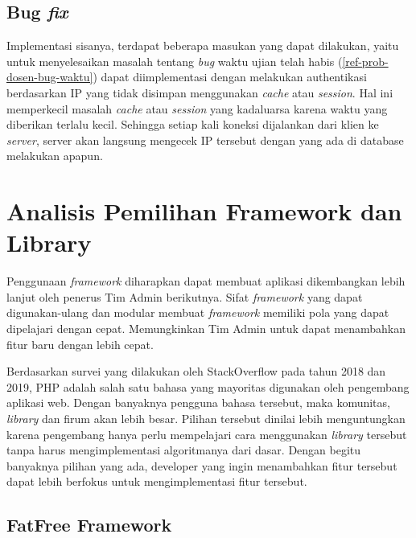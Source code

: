     \subsection{Bug \textit{fix}} Implementasi sisanya, terdapat beberapa
        masukan yang dapat dilakukan, yaitu untuk menyelesaikan masalah tentang
        \textit{bug} waktu ujian telah habis (\ref{ref-prob-dosen-bug-waktu})
        dapat diimplementasi dengan melakukan authentikasi berdasarkan IP yang
        tidak disimpan menggunakan \textit{cache} atau \textit{session}. Hal ini
        memperkecil masalah \textit{cache} atau \textit{session} yang kadaluarsa
        karena waktu yang diberikan terlalu kecil. Sehingga setiap kali koneksi
        dijalankan dari klien ke \textit{server}, server akan langsung mengecek
        IP tersebut dengan yang ada di database melakukan apapun.

\section{Analisis Pemilihan Framework dan Library}
Penggunaan \textit{framework} diharapkan dapat membuat aplikasi dikembangkan
lebih lanjut oleh penerus Tim Admin berikutnya. Sifat \textit{framework} yang
dapat digunakan-ulang dan modular membuat \textit{framework} memiliki pola yang
dapat dipelajari dengan cepat. Memungkinkan Tim Admin untuk dapat menambahkan
fitur baru dengan lebih cepat. 

Berdasarkan survei yang dilakukan oleh StackOverflow pada tahun
2018\cite{stackoverflow:survey-2018} dan 2019\cite{stackoverflow:survey-2019},
PHP adalah salah satu bahasa yang mayoritas digunakan oleh pengembang aplikasi
web. Dengan banyaknya pengguna bahasa tersebut, maka komunitas, \textit{library}
dan firum akan lebih besar. Pilihan tersebut dinilai lebih menguntungkan karena
pengembang hanya perlu mempelajari cara menggunakan \textit{library} tersebut
tanpa harus mengimplementasi algoritmanya dari dasar. Dengan begitu banyaknya
pilihan yang ada, developer yang ingin menambahkan fitur tersebut dapat lebih
berfokus untuk mengimplementasi fitur tersebut.

\subsection{FatFree Framework}

